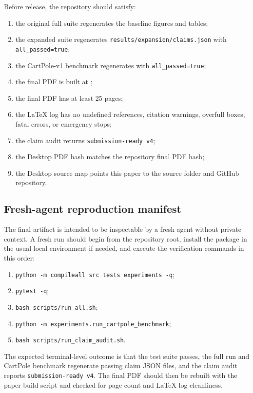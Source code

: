 Before release, the repository should satisfy:
\begin{enumerate}
  \item the original full suite regenerates the baseline figures and tables;
  \item the expanded suite regenerates \texttt{results/expansion/claims.json} with \texttt{all\_passed=true};
  \item the CartPole-v1 benchmark regenerates  with \texttt{all\_passed=true};
  \item the final PDF is built at ;
  \item the final PDF has at least 25 pages;
  \item the LaTeX log has no undefined references, citation warnings, overfull boxes, fatal errors, or emergency stops;
  \item the claim audit returns \texttt{submission-ready v4};
  \item the Desktop PDF hash matches the repository final PDF hash;
  \item the Desktop source map points this paper to the source folder and GitHub repository.
\end{enumerate}

\subsection{Fresh-agent reproduction manifest}

The final artifact is intended to be inspectable by a fresh agent without private context. A fresh run should begin from the repository root, install the package in the usual local environment if needed, and execute the verification commands in this order:
\begin{enumerate}
  \item \texttt{python -m compileall src tests experiments -q};
  \item \texttt{pytest -q};
  \item \texttt{bash scripts/run\_all.sh};
  \item \texttt{python -m experiments.run\_cartpole\_benchmark};
  \item \texttt{bash scripts/run\_claim\_audit.sh}.
\end{enumerate}
The expected terminal-level outcome is that the test suite passes, the full run and CartPole benchmark regenerate passing claim JSON files, and the claim audit reports \texttt{submission-ready v4}. The final PDF should then be rebuilt with the paper build script and checked for page count and LaTeX log cleanliness.

